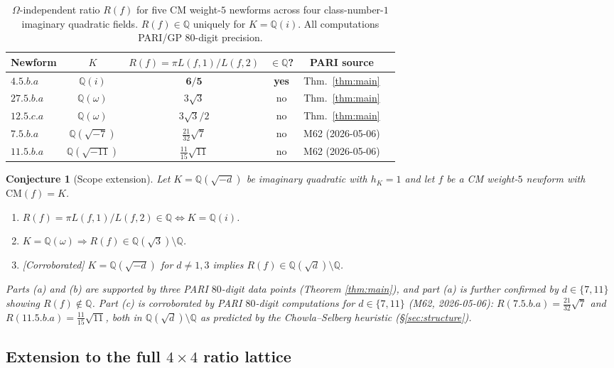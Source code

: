 \documentclass[10pt]{article}
\newtheorem{conjecture}[theorem]{Conjecture}
\theoremstyle{definition}
\newcommand{\Q}{\mathbb{Q}}
\begin{document}
\begin{table}[h]
\centering
\begin{tabular}{lccccl}
\hline
Newform & $K$ & $R(f)=\pi L(f,1)/L(f,2)$ & $\in\Q$? & PARI source\\
\hline
$4.5.b.a$ & $\Q(i)$ & $\mathbf{6/5}$ & \textbf{yes} & Thm.~\ref{thm:main}\\
$27.5.b.a$ & $\Q(\omega)$ & $3\sqrt{3}$ & no & Thm.~\ref{thm:main}\\
$12.5.c.a$ & $\Q(\omega)$ & $3\sqrt{3}/2$ & no & Thm.~\ref{thm:main}\\
$7.5.b.a$ & $\Q(\sqrt{-7})$ & $\tfrac{21}{32}\sqrt{7}$ & no & M62 (2026-05-06)\\
$11.5.b.a$ & $\Q(\sqrt{-11})$ & $\tfrac{11}{15}\sqrt{11}$ & no & M62 (2026-05-06)\\
\hline
\end{tabular}
\caption{$\Omega$-independent ratio $R(f)$ for five CM weight-$5$ newforms across
four class-number-$1$ imaginary quadratic fields.
$R(f)\in\Q$ uniquely for $K=\Q(i)$.  All computations PARI/GP $80$-digit precision.}
\label{tab:ratios}
\end{table}

\begin{conjecture}[Scope extension]
\label{conj:scope}
Let $K = \Q(\sqrt{-d})$ be imaginary quadratic with $h_K = 1$ and let $f$ be a
CM weight-$5$ newform with $\mathrm{CM}(f) = K$.
\begin{enumerate}
  \item[\rm(a)] $R(f) = \pi L(f,1)/L(f,2) \in \Q \iff K = \Q(i)$.
  \item[\rm(b)] $K = \Q(\omega) \Rightarrow R(f) \in \Q(\sqrt{3})\setminus\Q$.
  \item[\rm(c)] \textup{[Corroborated]} $K = \Q(\sqrt{-d})$ for $d \neq 1,3$ implies
        $R(f) \in \Q(\sqrt{d})\setminus\Q$.
\end{enumerate}
Parts \textup{(a)} and \textup{(b)} are supported by three PARI $80$-digit
data points (Theorem \ref{thm:main}), and part \textup{(a)} is further confirmed
by $d \in \{7, 11\}$ showing $R(f) \notin \Q$.
Part \textup{(c)} is corroborated by PARI $80$-digit computations for
$d \in \{7, 11\}$ (M62, 2026-05-06): $R(7.5.b.a) = \tfrac{21}{32}\sqrt{7}$ and
$R(11.5.b.a) = \tfrac{11}{15}\sqrt{11}$, both in $\Q(\sqrt{d})\setminus\Q$
as predicted by the Chowla--Selberg heuristic (\S\ref{sec:structure}).
\end{conjecture}

\subsection{Extension to the full $4\times 4$ ratio lattice}
\label{sec:4x4lattice}
\end{document}
